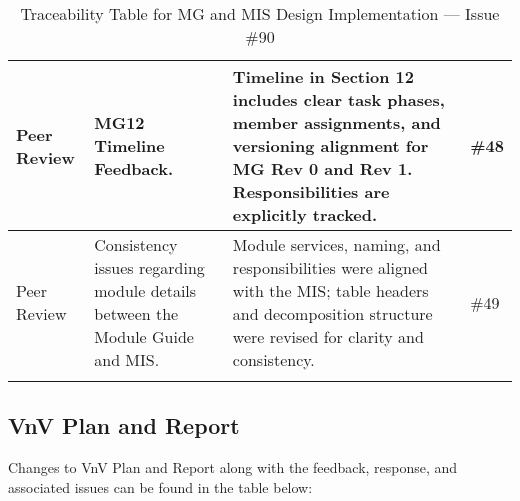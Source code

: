 \documentclass{article}
\begin{document}
\begin{longtable}{|p{2cm}|p{5cm}|p{5cm}|p{2cm}|}
\hline
Peer Review & MG12 Timeline Feedback. & Timeline in Section 12 includes clear task phases, member assignments, and versioning alignment for MG Rev 0 and Rev 1. Responsibilities are explicitly tracked. & \#48 \\
\hline
Peer Review & Consistency issues regarding module details between the Module Guide and MIS. & Module services, naming, and responsibilities were aligned with the MIS; table headers and decomposition structure were revised for clarity and consistency. & \#49 \\
\hline
\caption{Traceability Table for MG and MIS Design Implementation — Issue \#90}
\end{longtable}

\subsection{VnV Plan and Report}
Changes to VnV Plan and Report along with the feedback, response, and associated issues can be found in the table below: 
\end{document}
